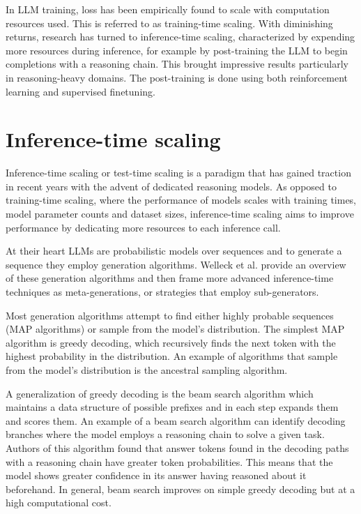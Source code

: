 In LLM training, loss has been empirically found to scale with computation resources used\cite{kaplan2020scalinglawsneurallanguage}. This is referred to as training-time scaling.
With diminishing returns, research has turned to inference-time scaling, characterized by expending more resources during inference, for example by post-training the LLM to begin completions
with a reasoning chain. This brought impressive results particularly in reasoning-heavy domains. The post-training is done using both reinforcement learning and supervised finetuning.

\section{Inference-time scaling}\label{sec:inference}
Inference-time scaling or test-time scaling is a paradigm that has gained traction in recent years
with the advent of dedicated reasoning models\cite{openai2024openaio1card}\cite{deepseekai2025deepseekr1incentivizingreasoningcapability}. 
As opposed to training-time scaling, where the performance of models scales with 
training times, model parameter counts and dataset sizes\cite{kaplan2020scalinglawsneurallanguage},
inference-time scaling aims to improve performance by dedicating more resources to each inference call.

At their heart LLMs are probabilistic models over sequences and to generate a sequence they employ generation algorithms. 
Welleck et al.\cite{welleck2024decodingmetagenerationinferencetimealgorithms} provide an overview of these generation algorithms
and then frame more advanced inference-time techniques as meta-generations, or strategies that employ sub-generators.

Most generation algorithms attempt to find either highly probable sequences (MAP algorithms) or sample from the model's distribution.
The simplest MAP algorithm is greedy decoding, which recursively finds the next token with the highest probability in the distribution.
An example of algorithms that sample from the model's distribution is the ancestral sampling algorithm\cite{welleck2024decodingmetagenerationinferencetimealgorithms}.

A generalization of greedy decoding is the beam search algorithm which maintains a data structure of possible prefixes and in each step expands them and scores them.
An example\cite{wang2024chainofthoughtreasoningprompting} of a beam search algorithm can identify decoding branches where the model 
employs a reasoning chain to solve a given task. Authors of this algorithm found that answer tokens found in the decoding paths with a reasoning chain 
have greater token probabilities. This means that the model shows greater confidence in its answer having reasoned about it beforehand.
In general, beam search improves on simple greedy decoding but at a high computational cost\cite{welleck2024decodingmetagenerationinferencetimealgorithms}.

